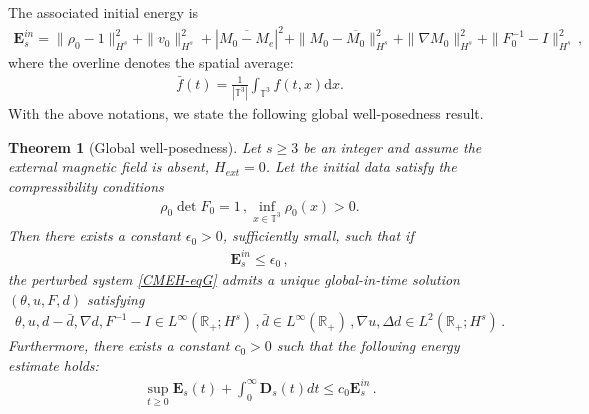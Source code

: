 \documentclass[reqno,11pt]{amsart}
\newtheorem{theorem}{Theorem}[section]
\numberwithin{equation}{section}
\def\d{\mathrm{d}}
\def\eps{\epsilon}
\begin{document}
The associated initial energy is
\begin{equation}\label{Esin-g}
    \begin{aligned}
        \mathbf{E}_s^{in} = \|\rho_0 - 1\|^2_{H^s}+\|v_0 \|^2_{H^s}+ | \overline{M_0 - M_e} |^2+\|M_0-\overline{M_0}\|^2_{H^s}+\|\nabla M_0\|^2_{H^s}+\|F^{-1}_0 - I\|^2_{H^s} \,,
    \end{aligned}
\end{equation}
where the overline denotes the spatial average: 
\begin{equation}\label{f-bar}
    \begin{aligned}
        \bar{f} (t) = \frac{1}{|\mathbb{T}^3|} \int_{\mathbb{T}^3} f (t,x) \d x .
    \end{aligned}
\end{equation}
With the above notations, we state the following global well-posedness result.

\begin{theorem}[Global well-posedness]\label{Thm2}
    Let $s \geq 3$ be an integer and assume the external magnetic field is absent, $H_{ext} = 0$. Let the initial data satisfy the compressibility conditions
    \begin{equation*}
        \begin{aligned}
            \rho_0 \det F_0 = 1 \,, \inf_{x \in \mathbb{T}^3} \rho_0 (x) > 0.
        \end{aligned}
    \end{equation*}
    Then there exists a constant $\eps_0 > 0$, sufficiently small, such that if 
    \begin{equation*}
        \begin{aligned}
            \mathbf{E}_s^{in} \leq \eps_0 \,,
        \end{aligned}
    \end{equation*}
    the perturbed system \eqref{CMEH-eqG} admits a unique global-in-time solution $(\theta, u, F, d)$ satisfying
    \begin{equation*}
        \begin{aligned}
            \theta, u, d - \bar{d}, \nabla d, F^{-1} - I \in L^\infty (\mathbb{R}_+; H^s) \,, \bar{d} \in L^\infty (\mathbb{R}_+) \,, \nabla u, \Delta d \in L^2 (\mathbb{R}_+; H^s) \,.
        \end{aligned}
    \end{equation*}
    Furthermore, there exists a constant $c_0 > 0$ such that the following energy estimate holds:
    \begin{equation*}
        \begin{aligned}
            \sup_{t \geq 0} \mathbf{E}_s(t) + \int_0^\infty \mathbf{D}_s (t) d t \leq c_0 \mathbf{E}_s^{in} \,.
        \end{aligned}
    \end{equation*}
\end{theorem}
\end{document}
